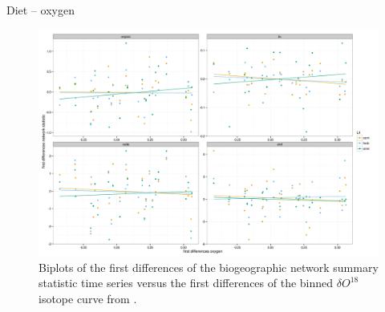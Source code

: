 \documentclass[final]{beamer}\usepackage[]{graphicx}\usepackage[]{color}
\newlength{\onecolwid}
\newlength{\twocolwid}
\begin{document}
\begin{frame}[t]
\begin{columns}[t]
\begin{column}{\twocolwid}
\begin{columns}[t,totalwidth = \twocolwid]
        \begin{column}{\onecolwid}
          \begin{block}{Diet -- oxygen}
            \begin{figure}[ht]
              \centering
              \includegraphics[height = 0.2\textheight]{figure/dt_oxy}
              \caption{Biplots of the first differences of the biogeographic network summary statistic time series versus the first differences of the binned \(\delta O^{18}\) isotope curve from \citep{Zachos2008}.}
              \label{fig:cor}
            \end{figure}
          \end{block}
        \end{column}
      \end{columns}


    \end{column}


\end{columns}
\end{frame}
\end{document}

